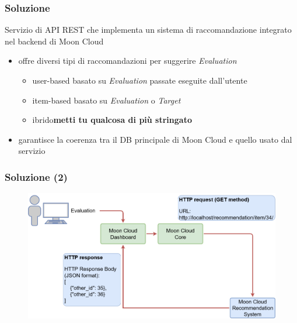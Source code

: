 \begin{frame}
    \frametitle{Soluzione}
    Servizio di \alert{API REST} che implementa un \alert{sistema di raccomandazione} \alert{integrato} nel \alert{backend} di Moon Cloud
    \begin{itemize}
        \item offre diversi tipi di raccomandazioni per \alert{suggerire \textit{Evaluation}}
        \begin{itemize}
            \item \alert{user-based} basato su \textit{Evaluation} passate eseguite dall'utente%
            \item \alert{item-based} basato su \textit{Evaluation} o \textit{Target}%
            \item \alert{ibrido}\textbf{metti tu qualcosa di più stringato}%
        \end{itemize}
        \item garantisce la \alert{coerenza} tra il DB principale di Moon Cloud e quello usato dal servizio
    \end{itemize}
\end{frame}

\begin{frame}
    \frametitle{Soluzione (2)}
    \begin{figure}
        \centering
        \includegraphics[scale=0.32]{images/UML_MoonCloud_HowToDoPres}
    \end{figure}
\end{frame}

